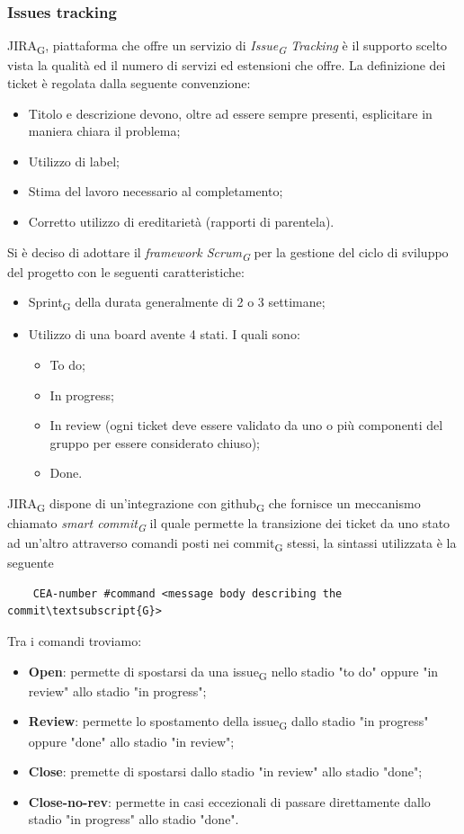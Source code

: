 	\subsubsection{Issues tracking}
	JIRA\textsubscript{G}, piattaforma che offre un servizio di \textit{Issue\textsubscript{G} Tracking} è il supporto scelto vista la qualità ed il numero di servizi ed estensioni che offre.
	\newline
	La definizione dei ticket è regolata dalla seguente convenzione:
	\begin{itemize}
		\item Titolo e descrizione devono, oltre ad essere sempre presenti, esplicitare in maniera chiara il problema;
		\item Utilizzo di label;
		\item Stima del lavoro necessario al completamento;
		\item Corretto utilizzo di ereditarietà (rapporti di parentela).
	\end{itemize}
	Si è deciso di adottare il \textit{framework Scrum\textsubscript{G}} per la gestione del ciclo di sviluppo del progetto con le seguenti caratteristiche:
	\begin{itemize}
		\item Sprint\textsubscript{G} della durata generalmente di 2 o 3 settimane;
		\item Utilizzo di una board avente 4 stati.
		I quali sono:
		\begin{itemize}
			\item To do;
			\item In progress;
			\item In review (ogni ticket deve essere validato da uno o più componenti del gruppo per essere considerato chiuso);
			\item Done.
		\end{itemize}
	\end{itemize}

	JIRA\textsubscript{G} dispone di un'integrazione con github\textsubscript{G} che fornisce un meccanismo chiamato \textit{smart commit\textsubscript{G}} il quale permette la transizione dei ticket da uno stato ad un'altro attraverso comandi posti nei commit\textsubscript{G} stessi, la sintassi utilizzata è la seguente
	\begin{lstlisting}
	CEA-number #command <message body describing the commit\textsubscript{G}>
	\end{lstlisting}
	Tra i comandi troviamo:
	\begin{itemize}
		\item \textbf{Open}: permette di spostarsi da una issue\textsubscript{G} nello stadio "to do" oppure "in review" allo stadio "in progress";
		\item \textbf{Review}: permette lo spostamento della issue\textsubscript{G} dallo stadio "in progress" oppure "done" allo stadio "in review";
		\item \textbf{Close}: premette di spostarsi dallo stadio "in review" allo stadio "done";
		\item \textbf{Close-no-rev}: permette in casi eccezionali di passare direttamente dallo stadio "in progress" allo stadio "done".
	\end{itemize}
	
